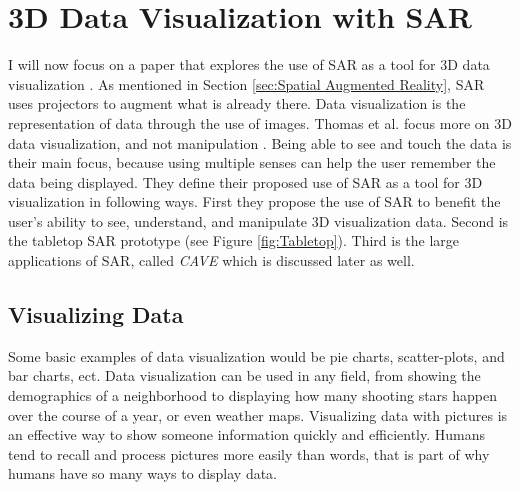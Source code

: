 \documentclass{sig-alternate}
\begin{document}
\section{3D Data Visualization with SAR}
\label{sec:3D Data Visualization}
I will now focus on a paper that explores the use of SAR as a tool for 3D data visualization \cite{3D}. As mentioned in Section \ref{sec:Spatial Augmented Reality}, SAR uses projectors to augment what is already there. Data visualization is the representation of data through the use of images. Thomas et al. focus more on 3D data visualization, and not manipulation \cite{3D}. Being able to see and touch the data is their main focus, because using multiple senses can help the user remember the data being displayed. They define their proposed use of SAR as a tool for 3D visualization in following ways. First they propose the use of SAR to benefit the user's ability to see, understand, and manipulate 3D visualization data. Second is the tabletop SAR prototype (see Figure \ref{fig:Tabletop}). Third is the large applications of SAR, called \textit{CAVE} which is discussed later as well.

\subsection{Visualizing Data}
\label{sec:Visualizing Data}
Some basic examples of data visualization would be pie charts, scatter-plots, and bar charts, ect. Data visualization can be used in any field, from showing the demographics of a neighborhood to displaying how many shooting stars happen over the course of a year, or even weather maps. Visualizing data with pictures is an effective way to show someone information quickly and efficiently. Humans tend to recall and process pictures more easily than words, that is part of why humans have so many ways to display data.   
\end{document}

